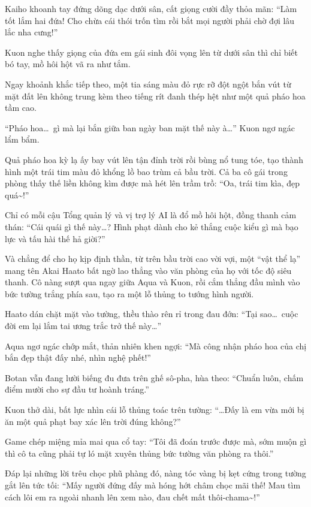 \documentclass[../main.tex]{subfiles}
\begin{document}
Kaiho khoanh tay đứng dõng dạc dưới sân, cất giọng cười đầy thỏa mãn: ``Làm tốt lắm hai đứa! Cho chừa cái thói trốn tìm rồi bắt mọi người phải chờ đợi lâu lắc nha cưng!''

Kuon nghe thấy giọng của đứa em gái sinh đôi vọng lên từ dưới sân thì chỉ biết bó tay, mồ hôi hột vã ra như tắm.

Ngay khoảnh khắc tiếp theo, một tia sáng màu đỏ rực rỡ đột ngột bắn vút từ mặt đất lên không trung kèm theo tiếng rít đanh thép hệt như một quả pháo hoa tầm cao.

``Pháo hoa\dots\ gì mà lại bắn giữa ban ngày ban mặt thế này à\dots'' Kuon ngơ ngác lẩm bẩm.

Quả pháo hoa kỳ lạ ấy bay vút lên tận đỉnh trời rồi bùng nổ tung tóe, tạo thành hình một trái tim màu đỏ khổng lồ bao trùm cả bầu trời. Cả ba cô gái trong phòng thấy thế liền không kìm được mà hét lên trầm trồ: ``Oa, trái tim kìa, đẹp quá\~{}!''


Chỉ có mỗi cậu Tổng quản lý và vị trợ lý AI là đổ mồ hôi hột, đồng thanh cảm thán: ``Cái quái gì thế này\dots? Hình phạt dành cho kẻ thắng cuộc kiểu gì mà bạo lực và tấu hài thế hả giời?''

Và chẳng để cho họ kịp định thần, từ trên bầu trời cao vời vợi, một ``vật thể lạ'' mang tên Akai Haato bất ngờ lao thẳng vào văn phòng của họ với tốc độ siêu thanh. Cô nàng sượt qua ngay giữa Aqua và Kuon, rồi cắm thẳng đầu mình vào bức tường trắng phía sau, tạo ra một lỗ thủng to tướng hình người.

Haato dán chặt mặt vào tường, thều thào rên rỉ trong đau đớn: ``Tại sao\dots\ cuộc đời em lại lắm tai ương trắc trở thế này\dots''

Aqua ngơ ngác chớp mắt, thản nhiên khen ngợi: ``Mà công nhận pháo hoa của chị bắn đẹp thật đấy nhé, nhìn nghệ phết!''

Botan vẫn đang lười biếng đu đưa trên ghế sô-pha, hùa theo: ``Chuẩn luôn, chấm điểm mười cho sự đầu tư hoành tráng.''

Kuon thở dài, bất lực nhìn cái lỗ thủng toác trên tường: ``\dots Đấy là em vừa mới bị ăn một quả phạt bay xác lên trời đúng không?''

Game chép miệng mỉa mai qua cổ tay: ``Tôi đã đoán trước được mà, sớm muộn gì thì cô ta cũng phải tự ló mặt xuyên thủng bức tường văn phòng ra thôi.''

Đáp lại những lời trêu chọc phũ phàng đó, nàng tóc vàng bị kẹt cứng trong tường gắt lên tức tối: ``Mấy người đứng đấy mà hóng hớt châm chọc mãi thế! Mau tìm cách lôi em ra ngoài nhanh lên xem nào, đau chết mất thôi-chama\~{}!''
\end{document}
